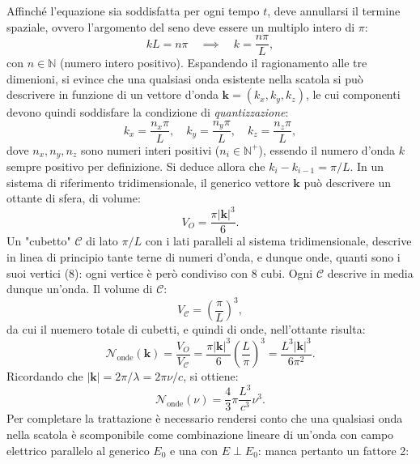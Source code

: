 \documentclass[a4paper,11pt]{report}
\begin{document}
Affinché l'equazione sia soddisfatta per ogni tempo $t$, deve annullarsi il termine spaziale, ovvero l'argomento del seno deve essere un multiplo intero di $\pi$:
\begin{equation}
kL = n\pi \quad \implies \quad k = \frac{n\pi}{L},
\end{equation}
con $n \in \mathbb{N}$ (numero intero positivo).
Espandendo il ragionamento alle tre dimenioni, si evince che una qualsiasi onda esistente nella scatola si può descrivere in funzione di un vettore d'onda $\bm{k} = (k_x, k_y, k_z)$, le cui componenti devono quindi soddisfare la condizione di \textit{quantizzazione}:
\begin{equation}
    k_x = \frac{n_x \pi}{L}, \quad k_y = \frac{n_y \pi}{L}, \quad k_z = \frac{n_z \pi}{L},
\end{equation}
dove $n_x, n_y, n_z$ sono numeri interi positivi ($n_i \in \mathbb{N}^+$), essendo il numero d'onda $k$ sempre positivo per definizione. Si deduce allora che $k_{i}-k_{i-1} = \pi/L$. In un sistema di riferimento tridimensionale, il generico vettore $\bm{k}$ può descrivere un ottante di sfera, di volume:
\begin{equation}
    V_O = \frac{\pi |\bm{k}|^3}{6}.
\end{equation}
Un "cubetto" $\mathcal{C}$ di lato $\pi/L$ con i lati paralleli al sistema tridimensionale, descrive in linea di principio tante terne di numeri d'onda, e dunque onde, quanti sono i suoi vertici (8): ogni vertice è però condiviso con 8 cubi. Ogni $\mathcal{C}$ descrive in media dunque un'onda. Il volume di $\mathcal{C}$:
\begin{equation}
V_{\mathcal{C}} = \left(\frac{\pi}{L}\right)^3,
\end{equation}
da cui il nuemero totale di cubetti, e quindi di onde, nell'ottante risulta:
\begin{equation}
\mathcal{N}_{\text{onde}}(\bm{k}) = \frac{V_O}{V_{\mathcal{C}}} = \frac{\pi |\bm{k}|^3}{6} \left(\frac{L}{\pi}\right)^3 = \frac{L^3|\bm{k}|^3}{6\pi^2}.
\end{equation}
Ricordando che $|\bm{k}| = 2\pi/\lambda = 2\pi\nu/c$, si ottiene:
\begin{equation}
\mathcal{N}_{\text{onde}}(\nu) = \frac{4}{3}\pi \frac{L^3}{c^3}\nu^3.
\end{equation}
Per completare la trattazione è necessario rendersi conto che una qualsiasi onda nella scatola è scomponibile come combinazione lineare di un'onda con campo elettrico parallelo al generico $E_0$ e una con $E \perp E_0$: manca pertanto un fattore 2:
\end{document}

